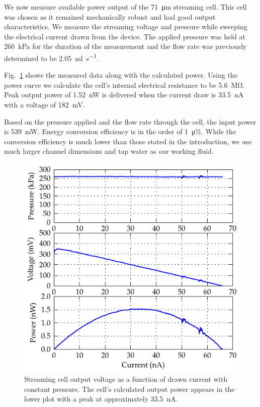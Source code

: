 \documentclass[10pt,final,journal]{IEEEtran}
\begin{document}
    We now measure available power output of the \SI{71}{\micro\metre} streaming cell.
    This cell was chosen as it remained mechanically robust and had good output characteristics.
    We measure the streaming voltage and pressure while sweeping the electrical current drawn from the device.
    The applied pressure was held at \SI{260}{\kilo\pascal} for the duration of the measurement and the flow rate was previously determined to be \SI{2.05}{\milli\litre\per\second}.

    Fig.~\ref{fig:cellOutput} shows the measured data along with the calculated power.
    Using the power curve we calculate the cell's internal electrical resistance to be \SI{5.6}{\mega\ohm}.
    Peak output power of \SI{1.52}{\nano\watt} is delivered when the current draw is \SI{33.5}{\nano\ampere} with a voltage of \SI{182}{\milli\volt}.

    Based on the pressure applied and the flow rate through the cell, the input power is \SI{539}{\milli\watt}.
    Energy conversion efficiency is in the order of \SI{1}{\micro\percent}.
    While the conversion efficiency is much lower than those stated in the introduction, we use much larger channel dimensions and tap water as our working fluid.

    \begin{figure}
        \begin{center}
        \includegraphics[width=\linewidth]{graph_cellOutput}
        \end{center}
        \caption{Streaming cell output voltage as a function of drawn current with constant pressure.
        The cell's calculated output power appears in the lower plot with a peak at approximately \SI{33.5}{\nano\ampere}.}
        \label{fig:cellOutput}
    \end{figure}
\end{document}
